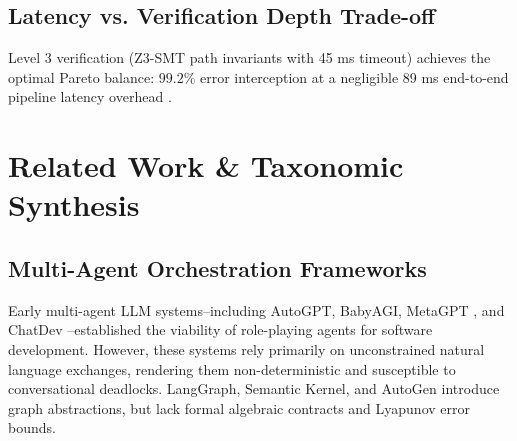 \documentclass[10pt,twocolumn,letterpaper]{article}
\begin{document}
\subsection{Latency vs. Verification Depth Trade-off}


\begin{table}[htbp]
\centering
\caption{Impact of SMT Verification Depth on Latency and Safety}
\end{table}

Level 3 verification (Z3-SMT path invariants with 45 ms timeout) achieves the optimal Pareto balance: $99.2\%$ error interception at a negligible 89 ms end-to-end pipeline latency overhead \cite{arxiv_2404_01131}.




\section{Related Work \& Taxonomic Synthesis}



\subsection{Multi-Agent Orchestration Frameworks}

Early multi-agent LLM systems--including AutoGPT, BabyAGI, MetaGPT \cite{crossref_10_48550_arxiv_2308_00352}, and ChatDev \cite{crossref_10_18653_v1_2024_acl_long_810}--established the viability of role-playing agents for software development. However, these systems rely primarily on unconstrained natural language exchanges, rendering them non-deterministic and susceptible to conversational deadlocks. LangGraph, Semantic Kernel, and AutoGen introduce graph abstractions, but lack formal algebraic contracts and Lyapunov error bounds.
\end{document}
